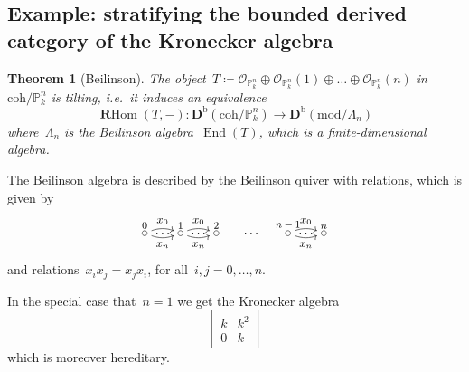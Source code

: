\documentclass[10pt,a4paper]{article}
\theoremstyle{lecture}
\newtheorem{theorem}{Theorem}
\newcommand\bounded{\ensuremath{\mathrm{b}}}
\newcommand\coh{\ensuremath{\mathrm{coh}}}
\newcommand\derived{\ensuremath{\mathbf{D}}}
\DeclareMathOperator\End{End}
\DeclareMathOperator\RRRHom{\mathbf{R}Hom}
\begin{document}
\subsection{Example: stratifying the bounded derived category of the Kronecker algebra}
\begin{theorem}[Beilinson]
  The object~$T\coloneqq\mathcal{O}_{\mathbb{P}_k^n}\oplus\mathcal{O}_{\mathbb{P}_k^n}(1)\oplus\ldots\oplus\mathcal{O}_{\mathbb{P}_k^n}(n)$ in~$\coh/\mathbb{P}_k^n$ is tilting, i.e.\ it induces an equivalence
  \begin{equation}
    \RRRHom(T,-)\colon\derived^\bounded(\coh/\mathbb{P}_k^n)\to\derived^\bounded(\mathrm{mod}/\Lambda_n)
  \end{equation}
  where~$\Lambda_n$ is the \emph{Beilinson algebra}~$\End(T)$, which is a finite-dimensional algebra.
\end{theorem}
The Beilinson algebra is described by the Beilinson quiver with relations, which is given by
\begin{equation}
  \begin{tikzpicture}[shorten >= 2pt, shorten <= 2pt]
    \node (v0) {};
    \node (v1) [right of = v0] {};
    \node (v2) [right of = v1] {};
    \node (v3) [right of = v2] {\ldots};
    \node (vn1) [right of = v3] {};
    \node (vn) [right of = vn1] {};

    \draw (v0)  circle (2pt) node [above] {\footnotesize 0};
    \draw (v1)  circle (2pt) node [above] {\footnotesize 1};
    \draw (v2)  circle (2pt) node [above] {\footnotesize 2};
    \draw (vn1) circle (2pt) node [above] {\footnotesize $n-1$};
    \draw (vn)  circle (2pt) node [above] {\footnotesize $n$};

    \path[->] (v0) edge [bend left = 20]  node [above] {\small $x_0$} (v1);
    \path[->] (v0) edge [bend right = 20] node [below] {\small $x_n$} (v1);
    \path (v0) -- (v1) node[midway] {$\hdots$};
    \path[->] (v1) edge [bend left = 20]  node [above] {\small $x_0$} (v2);
    \path[->] (v1) edge [bend right = 20] node [below] {\small $x_n$} (v2);
    \path (v1) -- (v2) node[midway] {$\hdots$};
    \path[->] (vn1) edge [bend left = 20]  node [above] {\small $x_0$} (vn);
    \path[->] (vn1) edge [bend right = 20] node [below] {\small $x_n$} (vn);
    \path (vn1) -- (vn) node[midway] {$\hdots$};
  \end{tikzpicture}
\end{equation}
and relations~$x_ix_j=x_jx_i$, for all~$i,j=0,\dotsc,n$.

In the special case that~$n=1$ we get the Kronecker algebra
\begin{equation}
  \begin{bmatrix} k & k^2 \\ 0 & k \end{bmatrix} 
\end{equation}
which is moreover hereditary.
\end{document}
